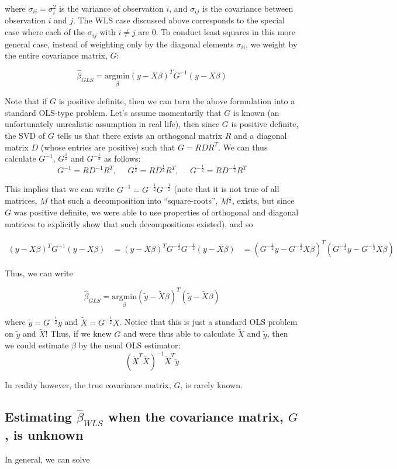 where $\sigma_{ii} = \sigma_i^2$ is the variance of observation $i$, and $\sigma_{ij}$ is the covariance between observation $i$ and $j$. The WLS case discussed above corresponds to the special case where each of the $\sigma_{ij}$ with $i \neq j$ are 0. To conduct least squares in this more general case, instead of weighting only by the diagonal elements $\sigma_{ii}$, we weight by the entire covariance matrix, $G$:

$$\hat{\beta}_{GLS} = \underset{\beta}{\text{argmin}} (y - X\beta)^T G^{-1}(y - X\beta)$$

Note that if $G$ is positive definite, then we can turn the above formulation into a standard OLS-type problem. Let's assume momentarily that $G$ is known (an unfortunately unrealistic assumption in real life), then since $G$ is positive definite, the SVD of $G$ tells us that there exists an orthogonal matrix $R$ and a diagonal matrix $D$ (whose entries are positive) such that $G = RDR^T$. We can thus calculate $G^{-1}$, $G^{\frac12}$ and $G^{-\frac12}$ as follows:
$$G^{-1} = RD^{-1}R^T, ~~~~~~G^{\frac12} = RD^{\frac12}R^T, ~~~~~~ G^{-\frac12} = RD^{-\frac12}R^T$$

This implies that we can write $G^{-1} = G^{-\frac12}G^{-\frac12}$ (note that it is not true of all matrices, $M$ that such a decomposition into ``square-roots'', $M^{\frac12}$, exists, but since $G$ was positive definite, we were able to use properties of orthogonal and diagonal matrices to explicitly show that such decompositions existed), and so

\begin{align*}
(y - X\beta)^T G^{-1}(y - X\beta) &= (y - X\beta)^T G^{-\frac12} G^{-\frac12}(y - X\beta)	
& = \left(G^{-\frac12} y - G^{-\frac12}X \beta\right)^T\left(G^{-\frac12}y - G^{-\frac12}X\beta\right)
\end{align*}

Thus, we can write

$$\hat{\beta}_{GLS} = \underset{\beta}{\text{argmin}} (\tilde{y} - \tilde{X}\beta)^T (\tilde{y} - \tilde{X}\beta)$$

where $\tilde{y} = G^{-\frac12}y$ and $\tilde{X} = G^{-\frac12} X$. Notice that this is just a standard OLS problem on $\tilde{y}$ and $\tilde{X}$! Thus, if we knew $G$ and were thus able to calculate $\tilde{X}$ and $\tilde{y}$, then we could estimate $\beta$ by the usual OLS estimator: $$(\tilde{X}^T\tilde{X})^{-1}\tilde{X}^T\tilde{y}$$

In reality however, the true covariance matrix, $G$, is rarely known.



\subsection*{Estimating $\hat{\beta}_{WLS}$ when the covariance matrix, $G$, is unknown}

In general, we can solve 


